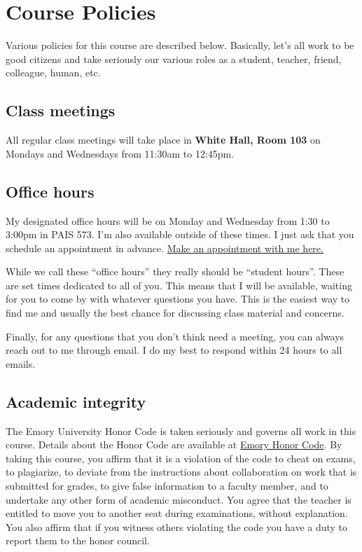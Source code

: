 \documentclass[11pt,]{article}
\begin{document}
\hypertarget{course-policies}{%
\section{Course Policies}\label{course-policies}}

Various policies for this course are described below. Basically, let's
all work to be good citizens and take seriously our various roles as a
student, teacher, friend, colleague, human, etc.

\hypertarget{class-meetings}{%
\subsection{Class meetings}\label{class-meetings}}

All regular class meetings will take place in \textbf{White Hall, Room
103} on Mondays and Wednesdays from 11:30am to 12:45pm.

\hypertarget{office-hours}{%
\subsection{Office hours}\label{office-hours}}

My designated office hours will be on Monday and Wednesday from 1:30 to
3:00pm in PAIS 573. I'm also available outside of these times. I just
ask that you schedule an appointment in advance.
\href{https://mccarthy-meetings.youcanbook.me/}{Make an appointment with
me here.}

While we call these ``office hours'' they really should be ``student
hours''. These are set times dedicated to all of you. This means that I
will be available, waiting for you to come by with whatever questions
you have. This is the easiest way to find me and usually the best chance
for discussing class material and concerns.

Finally, for any questions that you don't think need a meeting, you can
always reach out to me through email. I do my best to respond within 24
hours to all emails.

\hypertarget{academic-integrity}{%
\subsection{Academic integrity}\label{academic-integrity}}

The Emory University Honor Code is taken seriously and governs all work
in this course. Details about the Honor Code are available at
\href{http://catalog.college.emory.edu/academic/policies-regulations/honor-code.html}{Emory
Honor Code}. By taking this course, you affirm that it is a violation of
the code to cheat on exams, to plagiarize, to deviate from the
instructions about collaboration on work that is submitted for grades,
to give false information to a faculty member, and to undertake any
other form of academic misconduct. You agree that the teacher is
entitled to move you to another seat during examinations, without
explanation. You also affirm that if you witness others violating the
code you have a duty to report them to the honor council.
\end{document}
